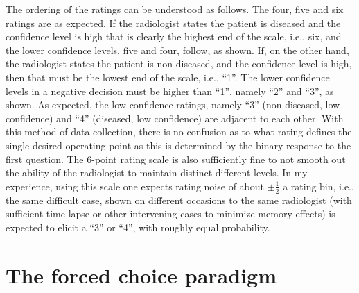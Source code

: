 \documentclass[
]{book}
\begin{document}
The ordering of the ratings can be understood as follows. The four, five and six ratings are as expected. If the radiologist states the patient is diseased and the confidence level is high that is clearly the highest end of the scale, i.e., six, and the lower confidence levels, five and four, follow, as shown. If, on the other hand, the radiologist states the patient is non-diseased, and the confidence level is high, then that must be the lowest end of the scale, i.e., ``1''. The lower confidence levels in a negative decision must be higher than ``1'', namely ``2'' and ``3'', as shown. As expected, the low confidence ratings, namely ``3'' (non-diseased, low confidence) and ``4'' (diseased, low confidence) are adjacent to each other. With this method of data-collection, there is no confusion as to what rating defines the single desired operating point as this is determined by the binary response to the first question. The 6-point rating scale is also sufficiently fine to not smooth out the ability of the radiologist to maintain distinct different levels. In my experience, using this scale one expects rating noise of about \(\pm\frac{1}{2}\) a rating bin, i.e., the same difficult case, shown on different occasions to the same radiologist (with sufficient time lapse or other intervening cases to minimize memory effects) is expected to elicit a ``3'' or ``4'', with roughly equal probability.

\hypertarget{binary-task-2afc}{%
\section{The forced choice paradigm}\label{binary-task-2afc}}
\end{document}
